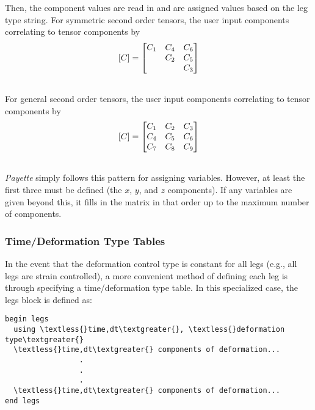 \documentclass[letterpaper,10pt,english]{sphinxmanual}
\begin{document}
Then, the component values  are read in and are assigned values based on
the leg type string. For symmetric second order tensors, the  user input
components correlating to tensor components by
\begin{gather}
\begin{split}[C] = \begin{bmatrix}
       C_{1} & C_{4} & C_{6} \\
             & C_{2} & C_{5} \\
             &       & C_{3}
      \end{bmatrix}\end{split}\notag\\\begin{split}\end{split}\notag
\end{gather}
For general second order tensors, the  user input components correlating
to tensor components by
\begin{gather}
\begin{split}[C] = \begin{bmatrix}
       C_{1} & C_{2} & C_{3} \\
       C_{4} & C_{5} & C_{6} \\
       C_{7} & C_{8} & C_{9}
      \end{bmatrix}\end{split}\notag\\\begin{split}\end{split}\notag
\end{gather}
\emph{Payette} simply follows this pattern for assigning variables. However, at
least the first three must be defined (the $x$, $y$, and $z$
components). If any variables are given beyond this, it fills in the matrix in
that order up to the maximum number of components.


\subsubsection{Time/Deformation Type Tables}
\label{Files/input_file_formatting:time-deformation-type-tables}
In the event that the deformation control type is constant for all legs (e.g.,
all legs are strain controlled), a more convenient method of defining each leg
is through specifying a time/deformation type table. In this specialized case,
the legs block is defined as:

\begin{Verbatim}[commandchars=\\\{\}]
begin legs
  using \textless{}time,dt\textgreater{}, \textless{}deformation type\textgreater{}
  \textless{}time,dt\textgreater{} components of deformation...
                 .
                 .
                 .
  \textless{}time,dt\textgreater{} components of deformation...
end legs
\end{Verbatim}
\end{document}
